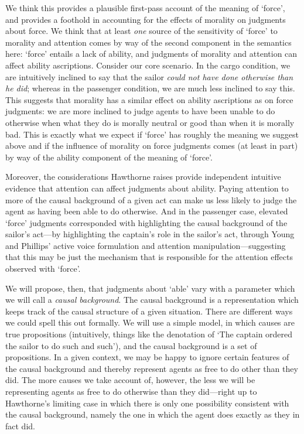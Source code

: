 \documentclass{salt}
\begin{document}
We think this provides a plausible first-pass account of the meaning of `force', and provides a foothold in accounting for the effects of morality on judgments about force. We think that at least \emph{one} source of the sensitivity of `force' to morality and attention comes by way of the second component in the semantics here: `force' entails a lack of ability, and judgments of morality and attention can affect ability ascriptions. Consider our core scenario. In the cargo condition, we are intuitively inclined to say that the sailor \emph{could not have done otherwise than he did}; whereas in the passenger condition, we are much less inclined to say this. This suggests that morality has a similar effect on ability ascriptions as on force judgments: we are more inclined to judge agents to have been unable to do otherwise when what they do is morally neutral or good than when it is morally bad. This is exactly what we expect if `force' has roughly the meaning we suggest above and if the influence of morality on force judgments comes (at least in part) by way of the ability component of the meaning of `force'.

Moreover, the considerations Hawthorne raises provide independent intuitive evidence that attention can affect judgments about ability. Paying attention to more of the causal background of a given act can make us less likely to judge the agent as having been able to do otherwise. And in the passenger case, elevated `force' judgments corresponded with highlighting the causal background of the sailor's act---by highlighting the captain's role in the sailor's act, through Young and Phillips' active voice formulation and attention manipulation---suggesting that this may be just the mechanism that is responsible for the attention effects observed with `force'. 

We will propose, then, that judgments about `able' vary with a parameter which we will call a \emph{causal background}. The causal background is a representation which keeps track of the causal structure of a given situation. There are different ways we could spell this out formally. We will use a simple model, in which causes are true propositions (intuitively, things like the denotation of `The captain ordered the sailor to do such and such'), and the causal background is a set of propositions. In a given context, we may be happy to ignore certain features of the causal background and thereby represent agents as free to do other than they did. The more causes we take account of, however, the less we will be representing agents as free to do otherwise than they did---right up to Hawthorne's limiting case in which there is only one possibility consistent with the causal background, namely the one in which the agent does exactly as they in fact did. 
\end{document}
